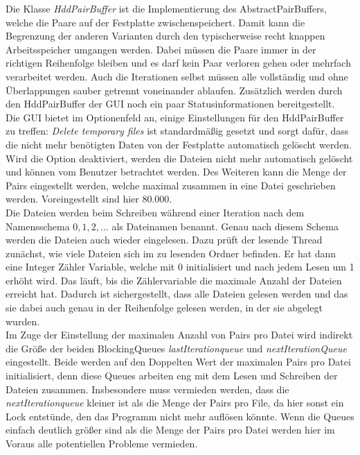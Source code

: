 \documentclass[12pt,a4paper]{article}
\begin{document}
Die Klasse \textit{HddPairBuffer} ist die Implementierung des AbstractPairBuffers, welche die Paare auf der Festplatte zwischenspeichert. Damit kann die Begrenzung der anderen Varianten durch den typischerweise recht knappen Arbeitsspeicher umgangen werden. Dabei müssen die Paare immer in der richtigen Reihenfolge bleiben und es darf kein Paar verloren gehen oder mehrfach verarbeitet werden. Auch die Iterationen selbst müssen alle vollständig und ohne Überlappungen sauber getrennt voneinander ablaufen. Zusätzlich werden durch den HddPairBuffer der GUI noch ein paar Statusinformationen bereitgestellt.\\
Die GUI bietet im Optionenfeld an, einige Einstellungen für den HddPairBuffer zu treffen: \textit{Delete temporary files} ist standardmäßig gesetzt und sorgt dafür, dass die nicht mehr benötigten Daten von der Festplatte automatisch gelöscht werden. Wird die Option deaktiviert, werden die Dateien nicht mehr automatisch gelöscht und können vom Benutzer betrachtet werden. Des Weiteren kann die Menge der Pairs eingestellt werden, welche maximal  zusammen in eine Datei geschrieben werden. Voreingestellt sind hier 80.000. \\
Die Dateien werden beim Schreiben während einer Iteration nach dem Namensschema $0, 1, 2, ...$  als Dateinamen benannt. Genau nach diesem Schema werden die Dateien auch wieder eingelesen. Dazu prüft der lesende Thread zunächst, wie viele Dateien sich im zu lesenden Ordner befinden. Er hat dann eine Integer Zähler Variable, welche mit 0 initialisiert und nach jedem Lesen um 1 erhöht wird. Das läuft, bis die Zählervariable die maximale Anzahl der Dateien erreicht hat. Dadurch ist sichergestellt, dass alle Dateien gelesen werden und das sie dabei auch genau in der Reihenfolge gelesen werden, in der sie abgelegt wurden. \\
Im Zuge der Einstellung der maximalen Anzahl von Pairs pro Datei wird indirekt die Größe der beiden BlockingQueues \textit{lastIterationqueue} und \textit{nextIterationQueue} eingestellt. Beide werden auf den Doppelten Wert der maximalen Pairs pro Datei initialisiert, denn diese Queues arbeiten eng mit dem Lesen und Schreiben der Dateien zusammen. Insbesondere muss vermieden werden, dass die \textit{nextIterationqueue} kleiner ist als die Menge der Pairs pro File, da hier sonst ein Lock entstünde, den das Programm nicht mehr auflösen könnte. Wenn die Queues einfach deutlich größer sind als die Menge der Pairs pro Datei werden hier im Voraus alle potentiellen Probleme vermieden. \\
\end{document}

